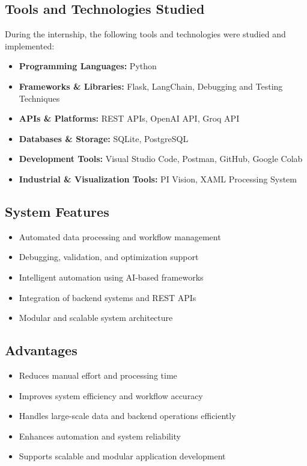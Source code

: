 \documentclass[12pt,a4paper]{report}
\begin{document}
\subsection{Tools and Technologies Studied}

During the internship, the following tools and technologies were studied and implemented:
\begin{itemize}[leftmargin=1.5cm]
    \item \textbf{Programming Languages:} Python
    \item \textbf{Frameworks \& Libraries:} Flask, LangChain, Debugging and Testing Techniques
    \item \textbf{APIs \& Platforms:} REST APIs, OpenAI API, Groq API
    \item \textbf{Databases \& Storage:} SQLite, PostgreSQL
    \item \textbf{Development Tools:} Visual Studio Code, Postman, GitHub, Google Colab
    \item \textbf{Industrial \& Visualization Tools:} PI Vision, XAML Processing System
\end{itemize}

\subsection{System Features}

\begin{itemize}[leftmargin=1.5cm]
    \item Automated data processing and workflow management
    \item Debugging, validation, and optimization support
    \item Intelligent automation using AI-based frameworks
    \item Integration of backend systems and REST APIs
    \item Modular and scalable system architecture
\end{itemize}

\subsection{Advantages}

\begin{itemize}[leftmargin=1.5cm]
    \item Reduces manual effort and processing time
    \item Improves system efficiency and workflow accuracy
    \item Handles large-scale data and backend operations efficiently
    \item Enhances automation and system reliability
    \item Supports scalable and modular application development
\end{itemize}
\end{document}
